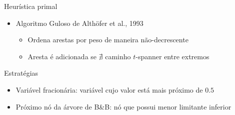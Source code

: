 \documentclass[dvipsnames]{beamer}
\begin{document}
\SetInd{0.5em}{0.6em}

\begin{frame}{Heurística primal}
  \hypertarget{heurprimal}{}
  \begin{itemize}
  \item<1-> Algoritmo Guloso de Althöfer et al., 1993
    \begin{itemize}
    \item<2-> Ordena arestas por peso de maneira não-decrescente
    \item<3-> Aresta é adicionada se $\nexists$ caminho $t$-spanner entre extremos
    \end{itemize}
  \end{itemize}
\end{frame}


  \begin{frame}{Estratégias}
    \begin{itemize}
    \item Variável fracionária: variável cujo valor está mais próximo de $\num{0,5}$
    \item <2->Próximo nó da árvore de B\&B: nó que possui menor limitante inferior
    \end{itemize}
  \end{frame}
  
\end{document}
